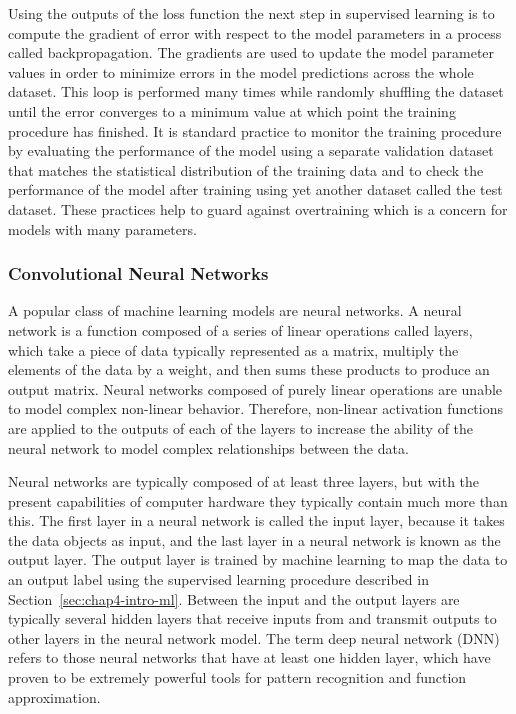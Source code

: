 Using the outputs of the loss function the next step in supervised learning is to compute the gradient of error with respect to the model parameters in a process called backpropagation. The gradients are used to update the model parameter values in order to minimize errors in the model predictions across the whole dataset. This loop is performed many times while randomly shuffling the dataset until the error converges to a minimum value at which point the training procedure has finished. It is standard practice to monitor the training procedure by evaluating the performance of the model using a separate validation dataset that matches the statistical distribution of the training data and to check the performance of the model after training using yet another dataset called the test dataset. These practices help to guard against overtraining which is a concern for models with many parameters.

\subsubsection*{Convolutional Neural Networks}

A popular class of machine learning models are neural networks. A neural network is a function composed of a series of linear operations called layers, which take a piece of data typically represented as a matrix, multiply the elements of the data by a weight, and then sums these products to produce an output matrix. Neural networks composed of purely linear operations are unable to model complex non-linear behavior. Therefore, non-linear activation functions are applied to the outputs of each of the layers to increase the ability of the neural network to model complex relationships between the data. 

Neural networks are typically composed of at least three layers, but with the present capabilities of computer hardware they typically contain much more than this. The first layer in a neural network is called the input layer, because it takes the data objects as input, and the last layer in a neural network is known as the output layer. The output layer is trained by machine learning to map the data to an output label using the supervised learning procedure described in Section~\ref{sec:chap4-intro-ml}. Between the input and the output layers are typically several hidden layers that receive inputs from and transmit outputs to other layers in the neural network model. The term deep neural network (DNN) refers to those neural networks that have at least one hidden layer, which have proven to be extremely powerful tools for pattern recognition and function approximation.

